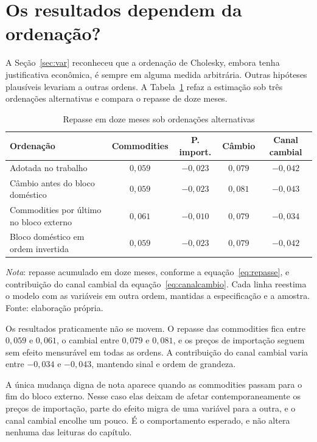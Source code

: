 \documentclass[12pt,openright,oneside,a4paper,portuguese,brazil]{abntex2}
\begin{document}
\section{Os resultados dependem da ordenação?}
\label{sec:resultadoordem}

A Seção~\ref{sec:var} reconheceu que a ordenação de Cholesky, embora tenha
justificativa econômica, é sempre em alguma medida arbitrária. Outras hipóteses
plausíveis levariam a outras ordens. A Tabela~\ref{tab:ordenacao} refaz a
estimação sob três ordenações alternativas e compara o repasse de doze meses.

\begin{table}[htbp]
\centering
\caption{Repasse em doze meses sob ordenações alternativas}
\label{tab:ordenacao}
\footnotesize
\begin{tabular}{lcccc}
\toprule
Ordenação & Commodities & P. import. & Câmbio & Canal cambial \\
\midrule
Adotada no trabalho                       & $0{,}059$ & $-0{,}023$ & $0{,}079$ & $-0{,}042$ \\
Câmbio antes do bloco doméstico           & $0{,}059$ & $-0{,}023$ & $0{,}081$ & $-0{,}043$ \\
Commodities por último no bloco externo   & $0{,}061$ & $-0{,}010$ & $0{,}079$ & $-0{,}034$ \\
Bloco doméstico em ordem invertida        & $0{,}059$ & $-0{,}023$ & $0{,}079$ & $-0{,}042$ \\
\bottomrule
\end{tabular}

\vspace{2pt}
\begin{flushleft}\footnotesize
\textit{Nota}: repasse acumulado em doze meses, conforme a
equação~\eqref{eq:repasse}, e contribuição do canal cambial da
equação~\eqref{eq:canalcambio}. Cada linha reestima o modelo com as variáveis
em outra ordem, mantidas a especificação e a amostra. Fonte: elaboração própria.
\end{flushleft}
\end{table}

Os resultados praticamente não se movem. O repasse das commodities fica entre
$0{,}059$ e $0{,}061$, o cambial entre $0{,}079$ e $0{,}081$, e os preços de
importação seguem sem efeito mensurável em todas as ordens. A contribuição do
canal cambial varia entre $-0{,}034$ e $-0{,}043$, mantendo sinal e ordem de
grandeza.

A única mudança digna de nota aparece quando as commodities passam para o fim
do bloco externo. Nesse caso elas deixam de afetar contemporaneamente os preços
de importação, parte do efeito migra de uma variável para a outra, e o canal
cambial encolhe um pouco. É o comportamento esperado, e não altera nenhuma das
leituras do capítulo.
\end{document}
